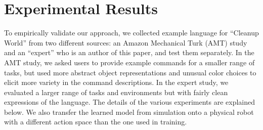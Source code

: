 \documentclass[conference]{IEEEtran}
\begin{document}


\section{Experimental Results}
To empirically validate our approach, we collected example language for ``Cleanup World'' from two different sources: an Amazon Mechanical Turk (AMT) study and an ``expert'' who is an author of this paper, and test them separately. %
In the AMT study, we asked users to provide example commands for a smaller range of tasks, but used more abstract object representations and unusual color choices to elicit more variety in the command descriptions. In the expert study, we evaluated a larger range of tasks and environments but with fairly clean expressions of the language. The details of the various experiments are explained below. We also transfer the learned model from simulation onto a physical robot with a different action space than the one used in training.

\end{document}
